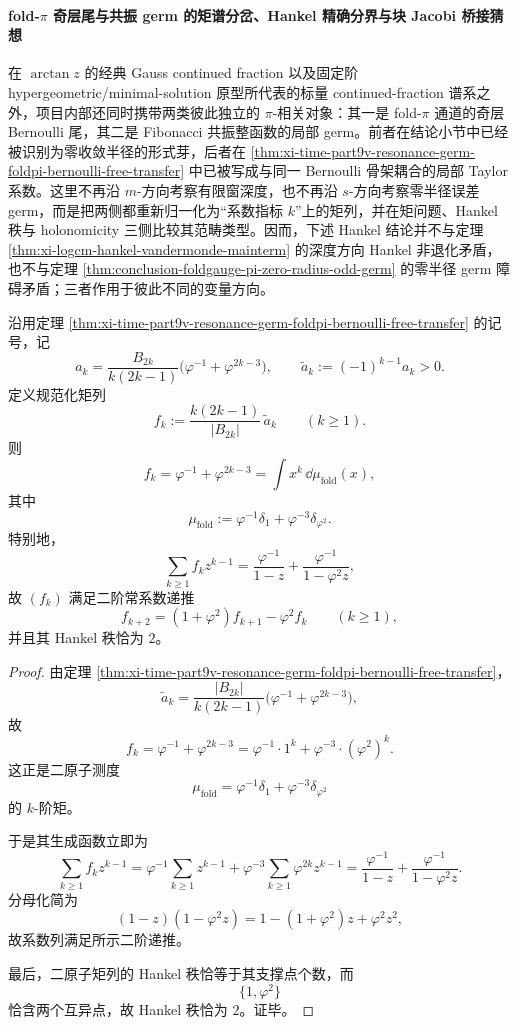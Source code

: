 \paragraph{fold-\texorpdfstring{$\pi$}{pi} 奇层尾与共振 germ 的矩谱分岔、Hankel 精确分界与块 Jacobi 桥接猜想}
在 \(\arctan z\) 的经典 Gauss continued fraction 以及固定阶 hypergeometric/minimal-solution 原型所代表的标量 continued-fraction 谱系之外，项目内部还同时携带两类彼此独立的 \(\pi\)-相关对象：其一是 fold-\(\pi\) 通道的奇层 Bernoulli 尾，其二是 Fibonacci 共振整函数的局部 germ。前者在结论小节中已经被识别为零收敛半径的形式芽，后者在 \ref{thm:xi-time-part9v-resonance-germ-foldpi-bernoulli-free-transfer} 中已被写成与同一 Bernoulli 骨架耦合的局部 Taylor 系数。这里不再沿 \(m\)-方向考察有限窗深度，也不再沿 \(s\)-方向考察零半径误差 germ，而是把两侧都重新归一化为“系数指标 \(k\)”上的矩列，并在矩问题、Hankel 秩与 holonomicity 三侧比较其范畴类型。因而，下述 Hankel 结论并不与定理 \ref{thm:xi-logcm-hankel-vandermonde-mainterm} 的深度方向 Hankel 非退化矛盾，也不与定理 \ref{thm:conclusion-foldgauge-pi-zero-radius-odd-germ} 的零半径 germ 障碍矛盾；三者作用于彼此不同的变量方向。

\begin{theorem}\label{thm:xi-time-part9zb-foldpi-two-atomic-moment-characterization}
沿用定理 \ref{thm:xi-time-part9v-resonance-germ-foldpi-bernoulli-free-transfer} 的记号，记
\[
a_k=\frac{B_{2k}}{k(2k-1)}
\bigl(\varphi^{-1}+\varphi^{2k-3}\bigr),
\qquad
\widetilde a_k:=(-1)^{k-1}a_k>0.
\]
定义规范化矩列
\[
f_k:=
\frac{k(2k-1)}{|B_{2k}|}\,\widetilde a_k
\qquad (k\ge 1).
\]
则
\[
f_k=\varphi^{-1}+\varphi^{2k-3}
=
\int x^k\,\dd\mu_{\mathrm{fold}}(x),
\]
其中
\[
\mu_{\mathrm{fold}}
:=
\varphi^{-1}\delta_1+\varphi^{-3}\delta_{\varphi^2}.
\]
特别地，
\[
\sum_{k\ge 1}f_k z^{k-1}
=
\frac{\varphi^{-1}}{1-z}
+
\frac{\varphi^{-1}}{1-\varphi^2 z},
\]
故 \((f_k)\) 满足二阶常系数递推
\[
f_{k+2}=(1+\varphi^2)f_{k+1}-\varphi^2 f_k
\qquad (k\ge 1),
\]
并且其 Hankel 秩恰为 \(2\)。
\end{theorem}
\begin{proof}
由定理 \ref{thm:xi-time-part9v-resonance-germ-foldpi-bernoulli-free-transfer}，
\[
\widetilde a_k
=
\frac{|B_{2k}|}{k(2k-1)}
\bigl(\varphi^{-1}+\varphi^{2k-3}\bigr),
\]
故
\[
f_k=\varphi^{-1}+\varphi^{2k-3}
=
\varphi^{-1}\cdot 1^k+\varphi^{-3}\cdot (\varphi^2)^k.
\]
这正是二原子测度
\[
\mu_{\mathrm{fold}}=\varphi^{-1}\delta_1+\varphi^{-3}\delta_{\varphi^2}
\]
的 \(k\)-阶矩。

于是其生成函数立即为
\[
\sum_{k\ge 1}f_k z^{k-1}
=
\varphi^{-1}\sum_{k\ge 1}z^{k-1}
+
\varphi^{-3}\sum_{k\ge 1}\varphi^{2k}z^{k-1}
=
\frac{\varphi^{-1}}{1-z}
+
\frac{\varphi^{-1}}{1-\varphi^2 z}.
\]
分母化简为
\[
(1-z)(1-\varphi^2 z)=1-(1+\varphi^2)z+\varphi^2 z^2,
\]
故系数列满足所示二阶递推。

最后，二原子矩列的 Hankel 秩恰等于其支撑点个数，而
\[
\{1,\varphi^2\}
\]
恰含两个互异点，故 Hankel 秩恰为 \(2\)。证毕。
\end{proof}

